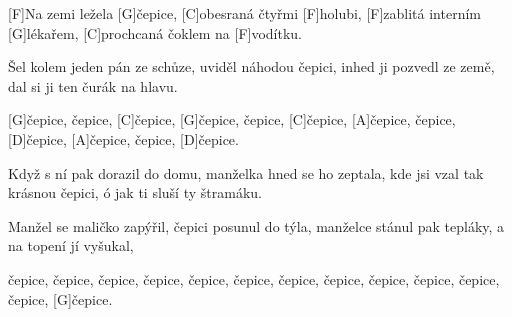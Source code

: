 
[F]Na zemi ležela [G]\null čepice,
[C]obesraná čtyřmi [F]holubi,
[F]zablitá interním [G]lékařem,
[C]prochcaná čoklem na [F]vodítku.

Šel kolem jeden pán ze schůze,
uviděl náhodou čepici,
inhed ji pozvedl ze země,
dal si ji ten čurák na hlavu.

[G]\null čepice, čepice, [C]\null čepice,
[G]\null čepice, čepice, [C]\null čepice,
[A]\null čepice, čepice, [D]\null čepice,
[A]\null čepice, čepice, [D]\null čepice.

Když s ní pak dorazil do domu,
manželka hned se ho zeptala,
kde jsi vzal tak krásnou čepici,
ó jak ti sluší ty štramáku.

Manžel se maličko zapýřil,
čepici posunul do týla,
manželce stánul pak tepláky,
a na topení jí vyšukal,

čepice, čepice, čepice,
čepice, čepice, čepice,
čepice, čepice, čepice, čepice, čepice, čepice, [G]\null čepice.